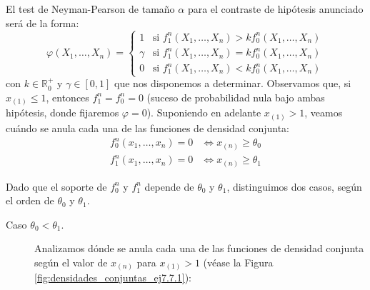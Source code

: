\begin{ejercicio}
    El test de Neyman-Pearson de tamaño $\alpha$ para el contraste de hipótesis anunciado será de la forma:
    \begin{equation*}
        \varphi(X_1, \ldots, X_n) = \left\{\begin{array}{ll}
            1 & \text{si\ } f_1^n(X_1, \ldots, X_n) > k f_0^n(X_1, \ldots, X_n) \\
            \gamma & \text{si\ } f_1^n(X_1, \ldots, X_n) = k f_0^n(X_1, \ldots, X_n) \\
            0 & \text{si\ } f_1^n(X_1, \ldots, X_n) < k f_0^n(X_1, \ldots, X_n)
        \end{array}\right.
    \end{equation*}
    con $k \in \mathbb{R}^+_0$ y $\gamma \in [0,1]$ que nos disponemos a determinar. Observamos que, si $x_{(1)} \leq 1$, entonces $f_1^n = f_0^n = 0$ (suceso de probabilidad nula bajo ambas hipótesis, donde fijaremos $\varphi = 0$). Suponiendo en adelante $x_{(1)} > 1$, veamos cuándo se anula cada una de las funciones de densidad conjunta:
    \begin{align*}
        f_0^n(x_1, \ldots, x_n) = 0 &\iff x_{(n)} \geq \theta_0 \\
        f_1^n(x_1, \ldots, x_n) = 0 &\iff x_{(n)} \geq \theta_1
    \end{align*}

    Dado que el soporte de $f_0^n$ y $f_1^n$ depende de $\theta_0$ y $\theta_1$, distinguimos dos casos, según el orden de $\theta_0$ y $\theta_1$.
    \begin{description}
        \item[Caso $\theta_0 < \theta_1$.] Analizamos dónde se anula cada una de las funciones de densidad conjunta según el valor de $x_{(n)}$ para $x_{(1)} > 1$ (véase la Figura \ref{fig:densidades_conjuntas_ej7.7.1}):
        \begin{figure}[h]
            \centering
\end{figure}
\end{description}
\end{ejercicio}

